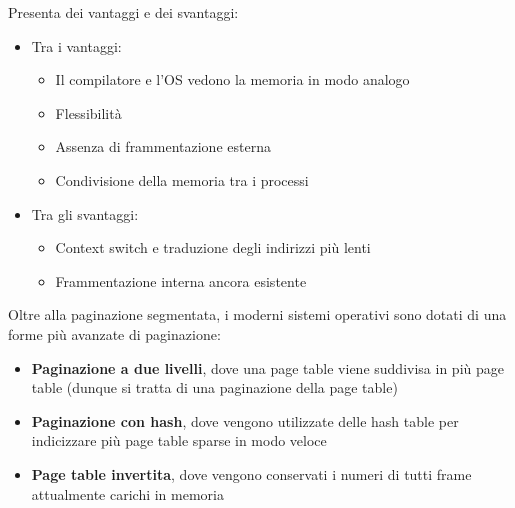 \documentclass{article}
\begin{document}
\pagebreak
Presenta dei vantaggi e dei svantaggi:
\begin{itemize}
    \item Tra i vantaggi:
    \begin{itemize}
        \item Il compilatore e l'OS vedono la memoria in modo analogo
        \item Flessibilità
        \item Assenza di frammentazione esterna
        \item Condivisione della memoria tra i processi
    \end{itemize}
    \item Tra gli svantaggi:
    \begin{itemize}
        \item Context switch e traduzione degli indirizzi più lenti 
        \item Frammentazione interna ancora esistente
    \end{itemize}
\end{itemize}
Oltre alla paginazione segmentata, i moderni sistemi operativi sono dotati di una forme più avanzate di paginazione:
\begin{itemize}
    \item \textbf{Paginazione a due livelli}, dove una page table viene suddivisa in più page table (dunque si tratta di una paginazione della page table)
    \item \textbf{Paginazione con hash}, dove vengono utilizzate delle hash table per indicizzare più page table sparse in modo veloce
    \item \textbf{Page table invertita}, dove vengono conservati i numeri di tutti frame attualmente carichi in memoria
\end{itemize}
\end{document}

